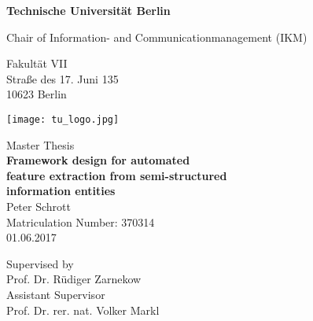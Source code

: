 \thispagestyle{empty}
\begin{center}

\vspace*{1.2cm}
{\LARGE \textbf{Technische Universität Berlin}}

\vspace{0.5cm}

{\large Chair of Information- and Communicationmanagement (IKM)\\[5mm]}

Fakultät VII\\
Straße des 17. Juni 135\\
10623 Berlin\\

\vspace*{1cm}

\texttt{[image: tu\_logo.jpg]}

\vspace*{1.0cm}

{\large Master Thesis}\\

\vspace{1.0cm}
{\LARGE \textbf{Framework design for automated}}\\
\vspace*{0.25cm}
{\LARGE \textbf{feature extraction from semi-structured}}\\
\vspace*{0.35cm}
{\LARGE \textbf{ information entities}}\\
\vspace*{1.0cm}
{\LARGE Peter Schrott}
\\
\vspace*{0.5cm}
Matriculation Number: 370314\\
01.06.2017\\ %
\vspace*{1.0cm}

Supervised by\\
Prof. Dr. Rüdiger Zarnekow\\
\vspace*{0.5cm}
Assistant Supervisor\\
Prof. Dr. rer. nat. Volker Markl
\vspace{3cm}

\end{center}